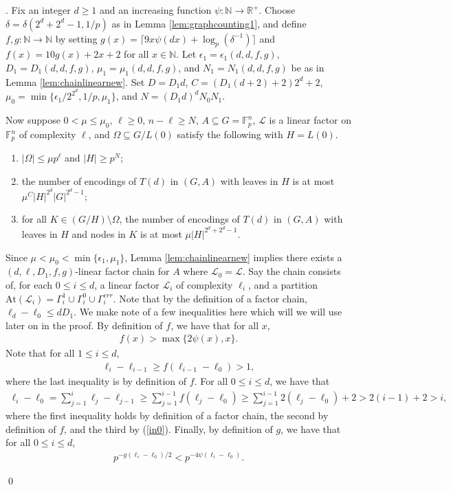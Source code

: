 \documentclass[12pt,oneside,british,a4wide]{amsart}
\numberwithin{equation}{section}
\theoremstyle{definition}
\def\F{\mathbb{F}}
\def\e{\epsilon}
\newcommand{\calL}{\mathcal{L}}
\newcommand{\At}{{\mathrm{At}}}
\newenvironment{proofof}[1]{\indent{\itshape Proof of #1}.\;}{\qed}
\begin{document}
\begin{proofof}{Theorem \ref{thm:almoststableinhstrong}} Fix an integer $d\geq 1$ and an increasing function $\psi:\mathbb{N}\rightarrow \mathbb{R}^+$. Choose $\delta=\delta(2^d+2^d-1,1/p)$  as in Lemma \ref{lem:graphcounting1}, and define  $f,g:\mathbb{N}\rightarrow \mathbb{N}$ by setting $g(x)=\lceil 9x\psi(dx)+\log_p(\delta^{-1})\rceil$ and $f(x)=10g(x)+2x+2$ for all $x\in \mathbb{N}$. Let $\e_1=\e_1(d,d,f,g)$, $D_1=D_1(d,d,f,g)$, $\mu_1=\mu_1(d, d,f,g)$, and $N_1=N_1(d, d,f,g)$ be as in Lemma \ref{lem:chainlinearnew}. Set $D=D_1d$, $C=(D_1(d+2)+2)2^d+2$, $\mu_0=\min\{\e_1/2^{2^d}, 1/p,\mu_1 \}$, and $N=(D_1d)^dN_0N_1$.

Now suppose $0<\mu\leq \mu_0$, $\ell\geq 0$, $n-\ell \geq N$, $A\subseteq G=\F_p^n$,  $\calL$ is a linear factor on $\F_p^n$ of complexity $\ell$, and $\Omega\subseteq G/L(0)$ satisfy the following with $H=L(0)$.
\begin{enumerate}
\item   $|\Omega|\leq \mu p^{\ell}$ and $|H|\geq p^N$;
\item the number of encodings of $T(d)$ in $(G,A)$ with leaves in $H$ is at most $\mu^C |H|^{2^d}|G|^{2^d-1}$;
\item for all $K\in (G/H)\setminus \Omega$, the number of encodings of $T(d)$ in $(G,A)$ with leaves in $H$ and nodes in $K$ is at most $\mu |H|^{2^d+2^d-1}$. 
\end{enumerate}

Since $\mu<\mu_0<\min\{\e_1,\mu_1\}$, Lemma \ref{lem:chainlinearnew} implies there exists a  $( d, \ell, D_1, f, g)$-linear factor chain for $A$ where $\calL_0=\calL$.  Say the chain consists of, for each $0\leq i\leq d$, a linear factor $\calL_i$ of complexity $\ell_i$, and a partition $\At(\calL_i)=\Gamma_i^1\cup \Gamma_i^0\cup \Gamma_i^{err}$.  Note that by the definition of a factor chain, $\ell_d-\ell_0\leq dD_1$.  We make note of a few inequalities here which will we will use later on in the proof.  By definition of $f$, we have that for all $x$,
\begin{align}\label{in1}
f(x)>\max\{2\psi(x),x\}.
\end{align}
Note that for all $1\leq i\leq d$, 
\begin{align}\label{in0}
\ell_i-\ell_{i-1}\geq f(\ell_{i-1}-\ell_{0})>1,
\end{align}
 where the last inequality is by definition of $f$. For all $0\leq i\leq d$, we have that 
\begin{align}\label{in2}
\ell_i-\ell_0=\sum_{j=1}^i\ell_j-\ell_{j-1}\geq \sum_{j=1}^{i-1} f(\ell_j-\ell_0)\geq \sum_{j=1}^{i-1} 2(\ell_j-\ell_0)+2>2(i-1)+2> i,
\end{align}
where the first inequality holds by definition of a factor chain, the second  by definition of $f$, and the third by (\ref{in0}).  Finally, by definition of $g$, we have that for all $0\leq i\leq d$,
\begin{align}\label{in3}
p^{-g(\ell_i-\ell_0)/2}<p^{-4\psi(\ell_i-\ell_0)}.
\end{align}


\end{proofof}
\end{document}
